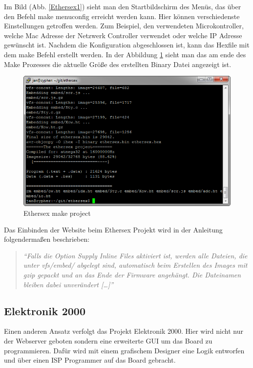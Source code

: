 Im Bild (Abb. \ref{Ethersex1}) sieht man den Startbildschirm des
Menüs, das über den Befehl \textrm{make menuconfig} erreicht werden kann.
Hier können verschiedenste Einstellungen getroffen werden. Zum Beispiel, den
verwendeten Microkontroller, welche Mac Adresse der Netzwerk Controller
verwendet oder welche IP Adresse gewünscht ist.
Nachdem die Konfiguration abgeschlossen ist, kann das Hexfile mit dem
\textrm{make} Befehl erstellt werden. In der Abbildung \ref{Ethersex2} sieht man
das am ende des \textrm{Make} Prozesses die aktuelle Größe des erstellten Binary Datei
angezeigt ist.

\begin{figure}[H]
	\centering
		\includegraphics[width=13cm]{content/pictures/Recherche/Ethersex/Ethersex2.png}
	\caption{Ethersex make project}
	\label{Ethersex2}
\end{figure} 

Das Einbinden der Website beim Ethersex Projekt wird in der Anleitung
folgendermaßen beschrieben:

\begin{quote}
	\textit{
		\enquote{Falls die Option Supply Inline Files aktiviert ist, werden alle
		Dateien, die unter vfs/embed/ abgelegt sind, automatisch beim Erstellen des
		Images mit gzip gepackt und an das Ende der Firmware angehängt. Die
		Dateinamen bleiben dabei unverändert [\ldots]} }
	\cite[\url{http://www.ethersex.de/index.php/HTTPD_(Deutsch)}]{Ethersex}
\end{quote}

\subsection{Elektronik 2000}

Einen anderen Ansatz verfolgt das Projekt Elektronik 2000.
Hier wird nicht nur der Webserver geboten sondern eine erweiterte GUI um das
Board zu programmieren. Dafür wird mit einem grafischem Designer eine Logik
entworfen und über einen ISP Programmer auf das Board gebracht.

